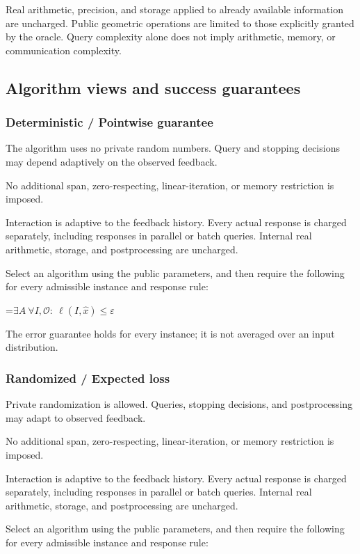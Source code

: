 \documentclass[10pt,a4paper]{article}
\newcommand{\AtlasMath}[1]{\par\begingroup\centering\setbox0=\hbox{$\displaystyle #1$}\ifdim\wd0>1.4\linewidth\typeout{ATLAS WIDE FORMULA: \the\wd0}\fi\ifdim\wd0>\linewidth\resizebox{\linewidth}{!}{\box0}\else\box0\fi\par\endgroup}
\begin{document}
Real arithmetic, precision, and storage applied to already available information are uncharged. Public geometric operations are limited to those explicitly granted by the oracle. Query complexity alone does not imply arithmetic, memory, or communication complexity.

\subsection{Algorithm views and success guarantees}
\subsubsection{Deterministic / Pointwise guarantee}
The algorithm uses no private random numbers. Query and stopping decisions may depend adaptively on the observed feedback.

No additional span, zero-respecting, linear-iteration, or memory restriction is imposed.

Interaction is adaptive to the feedback history. Every actual response is charged separately, including responses in parallel or batch queries. Internal real arithmetic, storage, and postprocessing are uncharged.

Select an algorithm using the public parameters, and then require the following for every admissible instance and response rule:


\AtlasMath{\exists A\ \forall I,\mathcal{O}:\ \ell(I,\widehat{x})\le\varepsilon}


The error guarantee holds for every instance; it is not averaged over an input distribution.

\subsubsection{Randomized / Expected loss}
Private randomization is allowed. Queries, stopping decisions, and postprocessing may adapt to observed feedback.

No additional span, zero-respecting, linear-iteration, or memory restriction is imposed.

Interaction is adaptive to the feedback history. Every actual response is charged separately, including responses in parallel or batch queries. Internal real arithmetic, storage, and postprocessing are uncharged.

Select an algorithm using the public parameters, and then require the following for every admissible instance and response rule:
\end{document}
